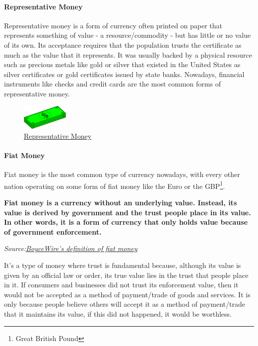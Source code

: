 \documentclass{article}
\newcommand\tab[1][1cm]{\hspace*{#1}}
\begin{document}
\paragraph{Representative Money}

\tab Representative money is a form of currency often printed on paper that represents something of value - a resource/commodity - but has little or no value of its own. Its acceptance requires that the population trusts the certificate as much as the value that it represents. It was usually backed by a physical resource such as precious metals like gold or silver that existed in the United States as silver certificates or gold certificates issued by state banks. Nowadays, financial instruments like checks and credit cards are the most common forms of representative money.

\begin{figure}[H]
    \begin{center}
        \includegraphics[width=0.2\textwidth]{images/dollar_bills.png}
        \caption{\href{https://lh3.googleusercontent.com/proxy/Kkpz0GitIhYF3RQMX4Rc9adthHDmpJeNtvSA395ZQ8QncVUxUo6ZsF15PNkorqYI5B5XXS18lon4rzLxxtKni9cXvCRebW0}{\underline{Representative Money}}}
    \end{center}
\end{figure}

\paragraph{Fiat Money}

\tab Fiat money is the most common type of currency nowadays, with every other nation operating on some form of fiat money like the Euro or the GBP\footnote{Great British Pound}.

\renewcommand{\epigraphflush}{center}
\epigraph{\textbf{Fiat money is a currency without an underlying value. Instead, its value is derived by government and the trust people place in its value. In other words, it is a form of currency that only holds value because of government enforcement.}}{\textit{Source:\href{https://boycewire.com/fiat-money-definition/#FiatVsRepresentative}{\underline{BoyceWire's definition of fiat money}}}}

It’s a type of money where trust is fundamental because, although its value is given by an official law or order, its true value lies in the trust that people place in it. If consumers and businesses did not trust its enforcement value, then it would not be accepted as a method of payment/trade of goods and services. It is only because people believe others will accept it as a method of payment/trade that it maintains its value, if this did not happened, it would be worthless.
\end{document}
